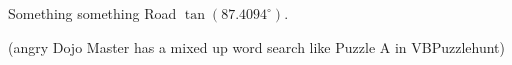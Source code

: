 

Something something Road \(\tan(87.4094^\circ)\).

(angry Dojo Master has a mixed up word search like Puzzle A in VBPuzzlehunt)


